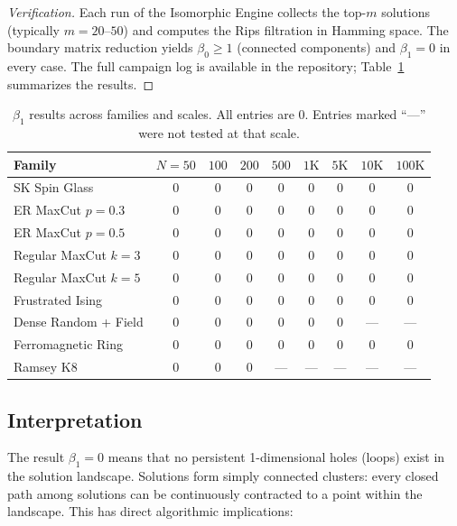 \documentclass[12pt,a4paper]{article}
\theoremstyle{definition}\newtheorem{definition}[theorem]{Definition}
\theoremstyle{remark}\newtheorem{remark}[theorem]{Remark}
\newcommand{\betaone}{\beta_1}
\newcommand{\betazero}{\beta_0}
\begin{document}
\begin{proof}[Verification]
Each run of the Isomorphic Engine collects the top-$m$ solutions (typically
$m = 20$--$50$) and computes the Rips filtration in Hamming space. The
boundary matrix reduction yields $\betazero \geq 1$ (connected components)
and $\betaone = 0$ in every case. The full campaign log is available in
the repository; Table~\ref{tab:beta1} summarizes the results.
\end{proof}

\begin{table}[H]
\centering
\caption{$\betaone$ results across families and scales. All entries are 0.
Entries marked ``---'' were not tested at that scale.}
\label{tab:beta1}
\small
\begin{tabular}{@{}lcccccccc@{}}
\toprule
\textbf{Family} & $N\!=\!50$ & $100$ & $200$ & $500$ & $1\mathrm{K}$ & $5\mathrm{K}$ & $10\mathrm{K}$ & $100\mathrm{K}$ \\
\midrule
SK Spin Glass        & 0 & 0 & 0 & 0 & 0 & 0 & 0 & 0 \\
ER MaxCut $p=0.3$    & 0 & 0 & 0 & 0 & 0 & 0 & 0 & 0 \\
ER MaxCut $p=0.5$    & 0 & 0 & 0 & 0 & 0 & 0 & 0 & 0 \\
Regular MaxCut $k\!=\!3$ & 0 & 0 & 0 & 0 & 0 & 0 & 0 & 0 \\
Regular MaxCut $k\!=\!5$ & 0 & 0 & 0 & 0 & 0 & 0 & 0 & 0 \\
Frustrated Ising     & 0 & 0 & 0 & 0 & 0 & 0 & 0 & 0 \\
Dense Random + Field & 0 & 0 & 0 & 0 & 0 & 0 & --- & --- \\
Ferromagnetic Ring   & 0 & 0 & 0 & 0 & 0 & 0 & 0 & 0 \\
Ramsey K8            & 0 & 0 & 0 & --- & --- & --- & --- & --- \\
\bottomrule
\end{tabular}
\end{table}

\subsection{Interpretation}

The result $\betaone = 0$ means that no persistent 1-dimensional holes
(loops) exist in the solution landscape. Solutions form simply connected
clusters: every closed path among solutions can be continuously contracted
to a point within the landscape. This has direct algorithmic implications:
\end{document}
